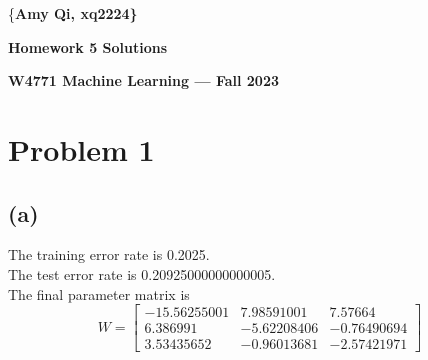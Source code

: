 \documentclass[11pt]{article}
\begin{document}
\centerline{\{\bf Amy Qi, xq2224\}}
\centerline{\bf Homework 5 Solutions}
\centerline{\bf W4771 Machine Learning --- Fall 2023}

\bigskip 
\bigskip

\section*{Problem 1}
\subsection*{(a)}
The training error rate is 0.2025. \\
The test error rate is 0.20925000000000005. \\
The final parameter matrix is 
\begin{equation}
    W = \begin{bmatrix}
        -15.56255001 & 7.98591001 & 7.57664 \\
        6.386991 & -5.62208406 & -0.76490694 \\
        3.53435652 & -0.96013681 & -2.57421971
    \end{bmatrix}
\end{equation}
\end{document}
